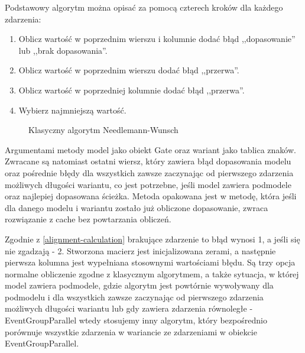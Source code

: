 Podstawowy algorytm można opisać za pomocą czterech kroków dla każdego zdarzenia:  
\begin{enumerate}
  \item Oblicz wartość w poprzednim wierszu i kolumnie dodać błąd ,,dopasowanie'' lub ,,brak dopasowania''.
  \item Oblicz wartość w poprzednim wierszu dodać błąd ,,przerwa''.
  \item Oblicz wartość w poprzedniej kolumnie dodać błąd ,,przerwa''.
  \item Wybierz najmniejszą wartość.
\end{enumerate}

\begin{figure}[h]
	\caption{\label{fig:algo_example}Klasyczny algorytm Needlemann-Wunsch}
\end{figure}


Argumentami metody model jako obiekt Gate oraz wariant jako tablica znaków. Zwracane są natomiast ostatni wiersz, który zawiera błąd dopasowania modelu oraz pośrednie błędy dla wszystkich zawsze zaczynając od pierwszego zdarzenia możliwych długości wariantu, co jest potrzebne, jeśli model zawiera podmodele oraz najlepiej dopasowana ścieżka. Metoda opakowana jest w metodę, która jeśli dla danego modelu i wariantu zostało już obliczone dopasowanie, zwraca rozwiązanie z cache bez powtarzania obliczeń.

Zgodnie z \ref{alignment-calculation} brakujące zdarzenie to błąd wynosi 1, a jeśli się nie zgadzają - 2. Stworzona macierz jest inicjalizowana zerami, a następnie pierwsza kolumna jest wypełniana stosownymi wartościami błędu. Są trzy opcja normalne obliczenie zgodne z klasycznym algorytmem, a także sytuacja, w której model zawiera podmodele, gdzie algorytm jest powtórnie wywoływany dla podmodelu i dla wszystkich zawsze zaczynając od pierwszego zdarzenia możliwych długości wariantu lub gdy zawiera zdarzenia równoległe - EventGroupParallel wtedy stosujemy inny algorytm, który bezpośrednio porównuje wszystkie zdarzenia w wariancie ze zdarzeniami w obiekcie EventGroupParallel. 
     
